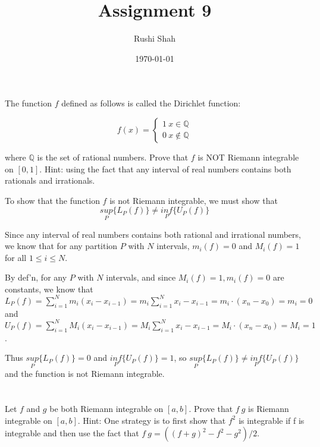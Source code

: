 \documentclass[]{article}
\author{Rushi Shah}
\date{\today}
\title{Assignment 9}
\newcommand{\rationals}{\mathbb{Q}}
\begin{document}
	\maketitle

	\section{}
		\begin{em}
			The function $f$ defined as follows is called the Dirichlet function:

			\[f(x) = \begin{cases}
				1\ x \in \rationals \\
				0\ x \notin \rationals
			\end{cases}\]

			where $\rationals$ is the set of rational numbers. Prove that $f$ is NOT Riemann integrable on $[0, 1]$. Hint: using the fact that any interval of real numbers contains both rationals and irrationals. 
		\end{em}

		To show that the function $f$ is not Riemann integrable, we must show that \[\underset{P}{sup}\{L_P(f)\} \neq \underset{P}{inf} \{U_P(f)\}\]

		Since any interval of real numbers contains both rational and irrational numbers, we know that for any partition $P$ with $N$ intervals, $m_i(f) = 0$ and $M_i(f) = 1$ for all $1 \leq i \leq N$. 

		By def'n, for any $P$ with $N$ intervals, and since $M_i(f) = 1, m_i(f) = 0$ are constants, we know that  $L_P(f) = \sum_{i = 1}^N m_i(x_i - x_{i - 1}) = m_i \sum_{i = 1}^N x_i - x_{i - 1} = m_i \cdot (x_n - x_0) = m_i = 0$ and $U_P(f) = \sum_{i = 1}^N M_i(x_i - x_{i - 1}) = M_i \sum_{i = 1}^N x_i - x_{i - 1} = M_i \cdot (x_n - x_0) = M_i = 1$. 

		Thus $\underset{P}{sup}\{L_P(f)\} = 0$ and $\underset{P}{inf} \{U_P(f)\} = 1$, so $\underset{P}{sup}\{L_P(f)\} \neq \underset{P}{inf} \{U_P(f)\}$ and the function is not Riemann integrable.

	\section{}
		\begin{em}
			Let $f$ and $g$ be both Riemann integrable on $[a, b]$. Prove that $f\ g$ is Riemann integrable on $[a, b]$. Hint: One strategy is to first show that $f^2$ is integrable if f is integrable and then use the fact that $f\ g = ((f + g)^2 - f^2 - g^2)/2$. 
		\end{em}
\end{document}
